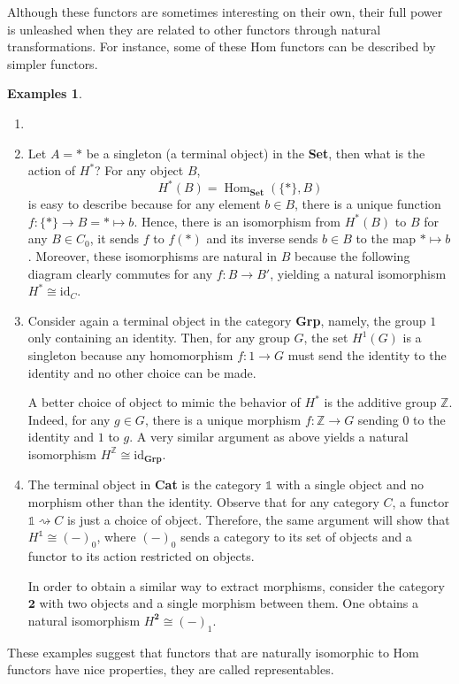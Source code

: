 \documentclass{article}
\theoremstyle{definition}
\newtheorem{exmps}[thm]{Examples}
\theoremstyle{remark}
\newcommand{\Z}{\mathbb{Z}}
\newcommand{\one}{\mathbb{1}}
\DeclareMathOperator{\Hom}{Hom}
\newcommand{\id}{\text{id}}
\begin{document}
Although these functors are sometimes interesting on their own, their full power is unleashed when they are related to other functors through natural transformations. For instance, some of these Hom functors can be described by simpler functors.
\begin{exmps}
	\begin{enumerate}
		\item[]
		\item Let $A=\ast$ be a singleton (a terminal object) in the \textbf{Set}, then what is the action of $H^{\ast}$? For any object $B$, \[H^{\ast}(B) = \Hom_{\textbf{Set}}(\{\ast\}, B)\]
		is easy to describe because for any element $b \in B$, there is a unique function $f: \{\ast\} \rightarrow B = \ast \mapsto b$. Hence, there is an isomorphism from $H^*(B)$ to $B$ for any $B \in C_0$, it sends $f$ to $f(*)$ and its inverse sends $b\in B$ to the map $*\mapsto b$. Moreover, these isomorphisms are natural in $B$ because the following diagram clearly commutes for any $f:B\rightarrow B'$, yielding a natural isomorphism $H^* \cong \id_C$.
		\begin{figure}[h]
			\centering
		\end{figure}
		\item Consider again a terminal object in the category \textbf{Grp}, namely, the group $1$ only containing an identity. Then, for any group $G$, the set $H^1(G)$ is a singleton because any homomorphism $f:1\rightarrow G$ must send the identity to the identity and no other choice can be made.
		
		A better choice of object to mimic the behavior of $H^*$ is the additive group $\Z$. Indeed, for any $g\in G$, there is a unique morphism $f:\Z \rightarrow G$ sending $0$ to the identity and $1$ to $g$. A very similar argument as above yields a natural isomorphism $H^{\Z} \cong \id_{\textbf{Grp}}$.
		\item The terminal object in \textbf{Cat} is the category $\one$ with a single object and no morphism other than the identity. Observe that for any category $C$, a functor $\one \rightsquigarrow C$ is just a choice of object. Therefore, the same argument will show that $H^{\one} \cong (-)_0$, where $(-)_0$ sends a category to its set of objects and a functor to its action restricted on objects.
		
	 	In order to obtain a similar way to extract morphisms, consider the category $\mathbf{2}$ with two objects and a single morphism between them. One obtains a natural isomorphism $H^{\mathbf{2}} \cong (-)_1$.
	\end{enumerate}
\end{exmps}
These examples suggest that functors that are naturally isomorphic to Hom functors have nice properties, they are called representables.
\end{document}
